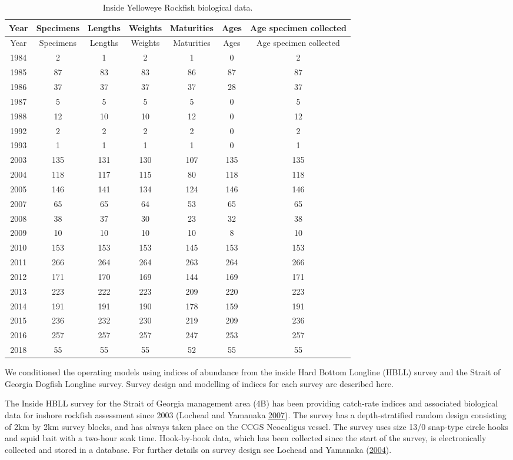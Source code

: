 \documentclass[11pt]{book}
\begin{document}
\hypertarget{summary-table-of-biological-data-available}{%
\label{summary-table-of-biological-data-available}}
\begin{longtable}[]{@{}ccccccc@{}}
\caption{\label{tab:test}Inside Yelloweye Rockfish biological data.}\tabularnewline
\toprule
Year & Specimens & Lengths & Weights & Maturities & Ages & Age specimen collected\tabularnewline
\midrule
\endfirsthead
\toprule
Year & Specimens & Lengths & Weights & Maturities & Ages & Age specimen collected\tabularnewline
\midrule
\endhead
1984 & 2 & 1 & 2 & 1 & 0 & 2\tabularnewline
1985 & 87 & 83 & 83 & 86 & 87 & 87\tabularnewline
1986 & 37 & 37 & 37 & 37 & 28 & 37\tabularnewline
1987 & 5 & 5 & 5 & 5 & 0 & 5\tabularnewline
1988 & 12 & 10 & 10 & 12 & 0 & 12\tabularnewline
1992 & 2 & 2 & 2 & 2 & 0 & 2\tabularnewline
1993 & 1 & 1 & 1 & 1 & 0 & 1\tabularnewline
2003 & 135 & 131 & 130 & 107 & 135 & 135\tabularnewline
2004 & 118 & 117 & 115 & 80 & 118 & 118\tabularnewline
2005 & 146 & 141 & 134 & 124 & 146 & 146\tabularnewline
2007 & 65 & 65 & 64 & 53 & 65 & 65\tabularnewline
2008 & 38 & 37 & 30 & 23 & 32 & 38\tabularnewline
2009 & 10 & 10 & 10 & 10 & 8 & 10\tabularnewline
2010 & 153 & 153 & 153 & 145 & 153 & 153\tabularnewline
2011 & 266 & 264 & 264 & 263 & 264 & 266\tabularnewline
2012 & 171 & 170 & 169 & 144 & 169 & 171\tabularnewline
2013 & 223 & 222 & 223 & 209 & 220 & 223\tabularnewline
2014 & 191 & 191 & 190 & 178 & 159 & 191\tabularnewline
2015 & 236 & 232 & 230 & 219 & 209 & 236\tabularnewline
2016 & 257 & 257 & 257 & 247 & 253 & 257\tabularnewline
2018 & 55 & 55 & 55 & 52 & 55 & 55\tabularnewline
\bottomrule
\end{longtable}
\clearpage


\clearpage

\label{app:index-data}

We conditioned the operating models using indices of abundance from the inside Hard Bottom Longline (HBLL) survey and the Strait of Georgia Dogfish Longline survey. Survey design and modelling of indices for each survey are described here.

\hypertarget{sec:hbll-index-data}{%
\label{sec:hbll-index-data}}

The Inside HBLL survey for the Strait of Georgia management area (4B) has been providing catch-rate indices and associated biological data for inshore rockfish assessment since 2003 (Lochead and Yamanaka \protect\hyperlink{ref-lochead2007}{2007}). The survey has a depth-stratified random design consisting of 2km by 2km survey blocks, and has always taken place on the CCGS Neocaligus vessel. The survey uses size 13/0 snap-type circle hooks and squid bait with a two-hour soak time. Hook-by-hook data, which has been collected since the start of the survey, is electronically collected and stored in a database. For further details on survey design see Lochead and Yamanaka (\protect\hyperlink{ref-lochead2004}{2004}).
\end{document}
